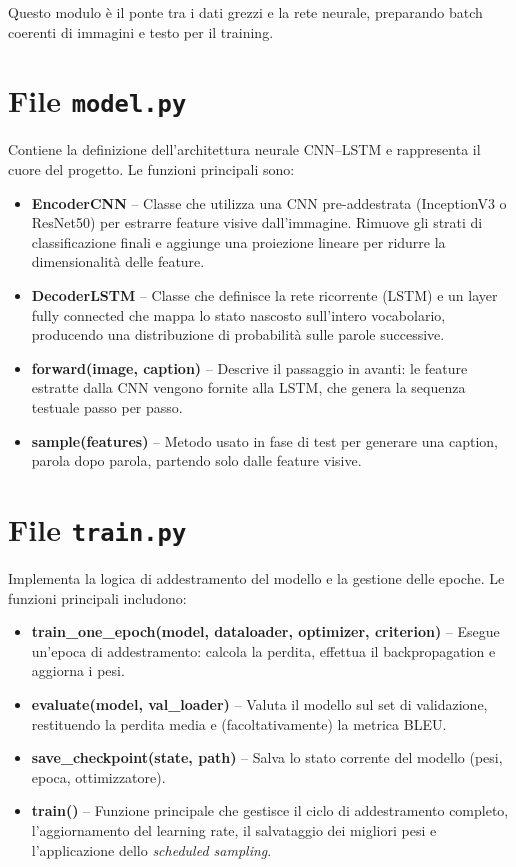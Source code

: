 \documentclass[11pt,a4paper]{report}
\begin{document}
Questo modulo è il ponte tra i dati grezzi e la rete neurale, preparando batch coerenti di immagini e testo per il training.

\section{File \texttt{model.py}}

Contiene la definizione dell'architettura neurale CNN–LSTM e rappresenta il cuore del progetto.  
Le funzioni principali sono:

\begin{itemize}
  \item \textbf{EncoderCNN} – Classe che utilizza una CNN pre-addestrata (InceptionV3 o ResNet50) per estrarre feature visive dall’immagine. Rimuove gli strati di classificazione finali e aggiunge una proiezione lineare per ridurre la dimensionalità delle feature.
  \item \textbf{DecoderLSTM} – Classe che definisce la rete ricorrente (LSTM) e un layer fully connected che mappa lo stato nascosto sull’intero vocabolario, producendo una distribuzione di probabilità sulle parole successive.
  \item \textbf{forward(image, caption)} – Descrive il passaggio in avanti: le feature estratte dalla CNN vengono fornite alla LSTM, che genera la sequenza testuale passo per passo.
  \item \textbf{sample(features)} – Metodo usato in fase di test per generare una caption, parola dopo parola, partendo solo dalle feature visive.
\end{itemize}

\section{File \texttt{train.py}}

Implementa la logica di addestramento del modello e la gestione delle epoche.  
Le funzioni principali includono:

\begin{itemize}
  \item \textbf{train\_one\_epoch(model, dataloader, optimizer, criterion)} – Esegue un’epoca di addestramento: calcola la perdita, effettua il backpropagation e aggiorna i pesi.
  \item \textbf{evaluate(model, val\_loader)} – Valuta il modello sul set di validazione, restituendo la perdita media e (facoltativamente) la metrica BLEU.
  \item \textbf{save\_checkpoint(state, path)} – Salva lo stato corrente del modello (pesi, epoca, ottimizzatore).
  \item \textbf{train()} – Funzione principale che gestisce il ciclo di addestramento completo, l’aggiornamento del learning rate, il salvataggio dei migliori pesi e l’applicazione dello \emph{scheduled sampling}.
\end{itemize}
\end{document}
